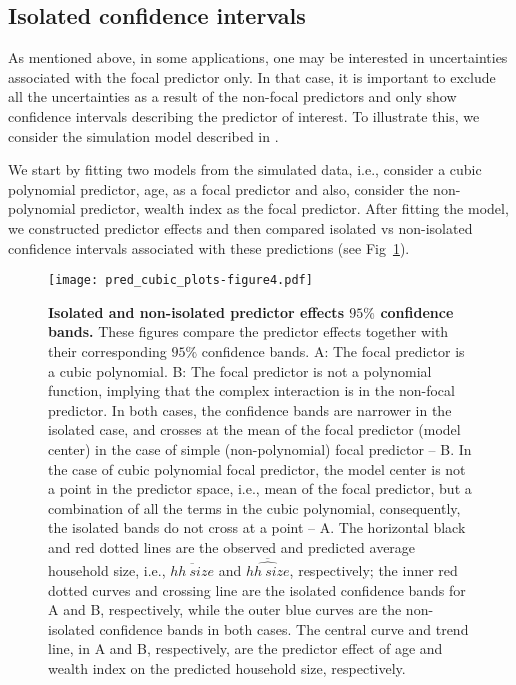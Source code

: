 \documentclass[10pt,letterpaper]{article}
\let\over=\overline
\begin{document}
\subsection*{Isolated confidence intervals}

As mentioned above, in some applications, one may be interested in uncertainties associated with the focal predictor only. In that case, it is important to exclude all the uncertainties as a result of the non-focal predictors and only show confidence intervals describing the predictor of interest. To illustrate this, we consider the simulation model described in . 

We start by fitting two models from the simulated data, i.e., consider a cubic polynomial predictor, age, as a focal predictor and also, consider the non-polynomial predictor, wealth index as the focal predictor. After fitting the model, we constructed predictor effects and then compared isolated vs non-isolated confidence intervals associated with these predictions (see Fig~\ref{fig:pred_cubic_plots}).

\begin{figure}[!h]
\centering
\texttt{[image: pred\_cubic\_plots-figure4.pdf]}
\caption{{\bf Isolated and non-isolated predictor effects $95\%$ confidence bands.} These figures compare the predictor effects together with their corresponding $95\%$ confidence bands. A: The focal predictor is a cubic polynomial. B: The focal predictor is not a polynomial function, implying that the complex interaction is in the non-focal predictor. In both cases, the confidence bands are narrower in the isolated case, and crosses at the mean of the focal predictor (model center) in the case of simple (non-polynomial) focal predictor -- B. In the case of cubic polynomial focal predictor, the model center is not a point in the predictor space, i.e., mean of the focal predictor, but a combination of all the terms in the cubic polynomial, consequently, the isolated bands do not cross at a point -- A. The horizontal black and red dotted lines are the observed and predicted average household size, i.e., $\over{hh~size}$ and $\over{\widehat{hh~size}}$, respectively; the inner red dotted curves and crossing line are the isolated confidence bands for A and B, respectively, while the outer blue curves are the non-isolated confidence bands in both cases. The central curve and trend line, in A and B, respectively, are the predictor effect of age and wealth index on the predicted household size, respectively.}
\label{fig:pred_cubic_plots}
\end{figure}
\end{document}
